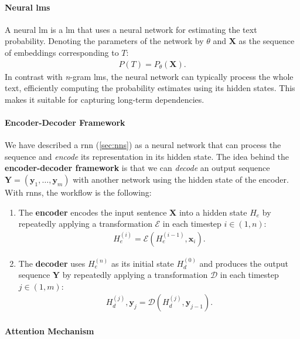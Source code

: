 \paragraph{Neural \acp{lm}} A neural \ac{lm} is a \acl{lm} that uses a neural network for estimating the text probability. Denoting the parameters of the network by $\theta$ and $\mathbf{X}$ as the sequence of embeddings corresponding to $T$:
\begin{align}
    P(T) = P_\theta(\mathbf{X}).
\end{align}
In contrast with \emph{n}-gram \acp{lm}, the neural network can typically process the whole text, efficiently computing the probability estimates using its hidden states. This makes it suitable for capturing long-term dependencies.


\paragraph{Encoder-Decoder Framework}
We have described a \ac{rnn} (\autoref{sec:nns}) as a neural network that can process the sequence and \emph{encode} its representation in its hidden state.
The idea behind the \textbf{encoder-decoder framework} \cite{sutskever2014sequence,cho2014learning} is that we can \emph{decode} an output sequence $\mathbf{Y} = (\mathbf{y}_1, \ldots, \mathbf{y}_m)$ with another network using the hidden state of the encoder. With \acp{rnn}, the workflow is the following:

\begin{enumerate}
    \item The \textbf{encoder} encodes the input sentence $\mathbf{X}$ into a hidden state $H_e$ by repeatedly applying a transformation $\mathcal{E}$ in each timestep $i\in(1,n)$:
          \begin{align}
              H_e^{(i)} = \mathcal{E}(H_e^{(i-1)}, \mathbf{x}_i).
          \end{align}
    \item The \textbf{decoder} uses $H_e^{(n)}$ as its initial state $H_d^{(0)}$ and produces the output sequence $\mathbf{Y}$ by repeatedly applying a transformation $\mathcal{D}$ in each timestep $j\in(1,m)$:
          \begin{align}
              H_d^{(j)}, \mathbf{y}_j = \mathcal{D}(H_d^{(j)}, \mathbf{y}_{j-1}).
          \end{align}
\end{enumerate}

\paragraph{Attention Mechanism}



